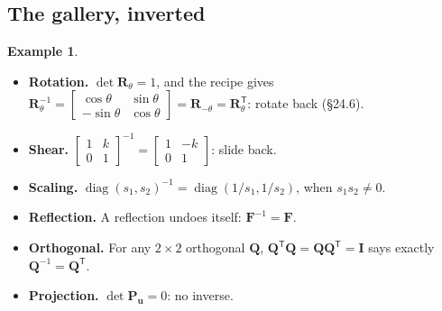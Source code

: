 \documentclass[11pt]{article}
\theoremstyle{plain}
\theoremstyle{definition}
\newtheorem{ex}{Example}[section]
\theoremstyle{remark}
\newcommand{\vc}[1]{\mathbf{#1}}
\newcommand{\mt}[1]{\mathbf{#1}}
\newcommand{\T}{^{\mathsf{T}}}
\DeclareMathOperator{\diagop}{diag}
\begin{document}
\subsection{The gallery, inverted}
\begin{ex}
\leavevmode
\begin{itemize}[leftmargin=1.4em,itemsep=4pt]
  \item \textbf{Rotation.} $\det\mt{R}_\theta=1$, and the recipe gives
        $\mt{R}_\theta^{-1}=\begin{bmatrix}\cos\theta&\sin\theta\\-\sin\theta&\cos\theta\end{bmatrix}
        =\mt{R}_{-\theta}=\mt{R}_\theta\T$: rotate back (\S24.6).
  \item \textbf{Shear.} $\begin{bmatrix}1&k\\0&1\end{bmatrix}^{-1}=\begin{bmatrix}1&-k\\0&1\end{bmatrix}$:
        slide back.
  \item \textbf{Scaling.} $\diagop(s_1,s_2)^{-1}=\diagop(1/s_1,1/s_2)$, when
        $s_1s_2\neq0$.
  \item \textbf{Reflection.} A reflection undoes itself: $\mt{F}^{-1}=\mt{F}$.
  \item \textbf{Orthogonal.} For any $2\times2$ orthogonal $\mt{Q}$,
        $\mt{Q}\T\mt{Q}=\mt{Q}\mt{Q}\T=\mt{I}$ says exactly $\mt{Q}^{-1}=\mt{Q}\T$.
  \item \textbf{Projection.} $\det\mt{P}_{\vc{u}}=0$: no inverse.
\end{itemize}
\end{ex}

\end{document}
